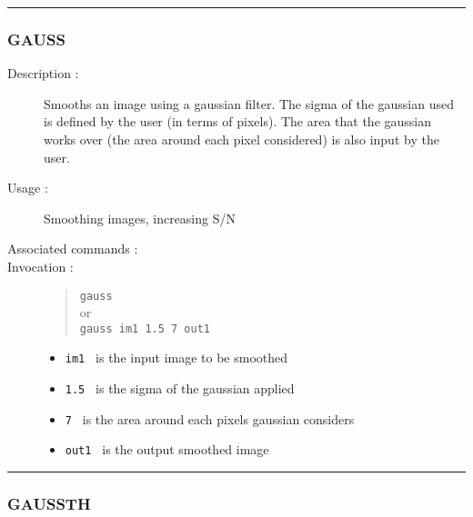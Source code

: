 \hrule
\subsubsection*{\label{GAUSS}GAUSS}

\begin{description}

\item[Description :] Smooths an image using a gaussian filter.  The
sigma of the gaussian used is defined by the user (in terms of
pixels).  The area that the gaussian works over (the area around each
pixel considered) is also input by the user.

\item[Usage :] Smoothing images, increasing S/N
\item[Associated commands :] {\tt {}}
\item[Invocation :]

\begin{quote}{\tt  gauss }\\
or \\
{\tt gauss im1 1.5 7 out1 }
\end{quote}

\begin{itemize}

\item {\tt im1 } is the input image to be smoothed
\item {\tt 1.5 } is the sigma of the gaussian applied
\item {\tt 7 } is the area around each pixels gaussian considers
\item {\tt out1 } is the output smoothed image
\end{itemize}

\end{description}

\hrule
\subsubsection*{\label{GAUSSTH}GAUSSTH}

